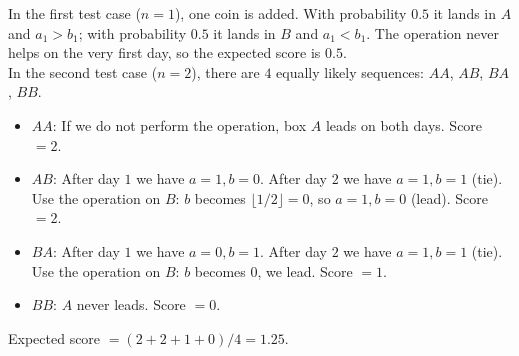 In the first test case ($n = 1$), one coin is added. With probability $0.5$ it lands in $A$ and $a_1 > b_1$; with probability $0.5$ it lands in $B$ and $a_1 < b_1$. The operation never helps on the very first day, so the expected score is $0.5$.
$$$$
In the second test case ($n = 2$), there are $4$ equally likely sequences: $AA$, $AB$, $BA$, $BB$.

\begin{itemize}
\item $AA$: If we do not perform the operation, box $A$ leads on both days. Score $= 2$.
\item $AB$: After day $1$ we have $a=1,b=0$. After day $2$ we have $a=1,b=1$ (tie). Use the operation on $B$: $b$ becomes $\lfloor 1/2 \rfloor = 0$, so $a=1,b=0$ (lead). Score $= 2$.
\item $BA$: After day $1$ we have $a=0,b=1$. After day $2$ we have $a=1,b=1$ (tie). Use the operation on $B$: $b$ becomes $0$, we lead. Score $= 1$.
\item $BB$: $A$ never leads. Score $= 0$.
\end{itemize}

Expected score $= (2 + 2 + 1 + 0) / 4 = 1.25$.